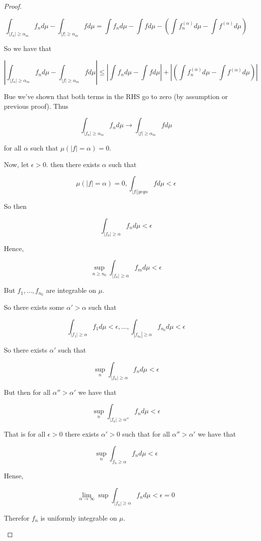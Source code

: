 \documentclass[11pt,fleqn]{book} %
\begin{document}
\begin{proof}
\begin{enumerate}
				$$\int_{|f_n| \geq \alpha_m} f_n d\mu - \int_{|f| \geq \alpha_m} f d\mu = \int f_n d\mu - \int f d\mu - (\int f_n^{(\alpha)} d\mu - \int f^{(\alpha)} d\mu) $$


So we have that 

		$$ \left| \int_{|f_n| \geq \alpha_m} f_n d\mu - \int_{|f| \geq \alpha_m} f d\mu \right| \leq \left| \int f_n d\mu - \int f d\mu \right| + \left|(\int f_n^{(\alpha)} d\mu - \int f^{(\alpha)} d\mu) \right|$$

Bue we've shown that both terms in the RHS go to zero (by assumption or previous proof). Thus

		$$\int_{|f_n| \geq \alpha_m} f_n d\mu \rightarrow \int_{|f| \geq \alpha_m} f d\mu  $$


for all $\alpha$ such that $\mu(|f| = \alpha) = 0$. 

Now, let $\epsilon > 0$. then there exists $\alpha$ such that

		$$\mu(|f| = \alpha) = 0, \int_{|f| ]geq \alpha} f d\mu < \epsilon $$

So then 

		$$\int_{|f_n| \geq \alpha} f_n d\mu < \epsilon $$

Hence, 

		$$\sup_{n \geq n_0} \int_{|f_n| \geq \alpha} f_m d\mu < \epsilon $$ 

But $f_1, \dots, f_{n_0} $ are integrable on $\mu$. 

So there exists some $\alpha' > \alpha$ such that 

		$$ \int_{|f_1| \geq \alpha} f_1 d\mu < \epsilon, \dots, \int_{|f_{n_0}| \geq \alpha} f_{n_0} d\mu < \epsilon$$

So there exists $\alpha'$ such that 

		$$\sup_n \int_{|f_n| \geq \alpha} f_n d\mu < \epsilon $$

But then for all $\alpha'' > \alpha'$ we have that 

		$$\sup_n \int_{|f_n| \geq \alpha''} f_n d\mu < \epsilon $$

That is for all $\epsilon > 0$ there exists $\alpha' > 0$ such that for all $\alpha'' > \alpha'$ we have that

		$$\sup_n \int_{f_n \geq \alpha} f_n d\mu < \epsilon $$

Hense, 

		$$\lim_{\alpha \rightarrow \infty} \sup \int_{|f_n| \geq \alpha} f_n d\mu < \epsilon = 0$$

Therefor $f_n$ is uniformly integrable on $\mu$.


	\end{enumerate}
\end{proof}
\end{document}
